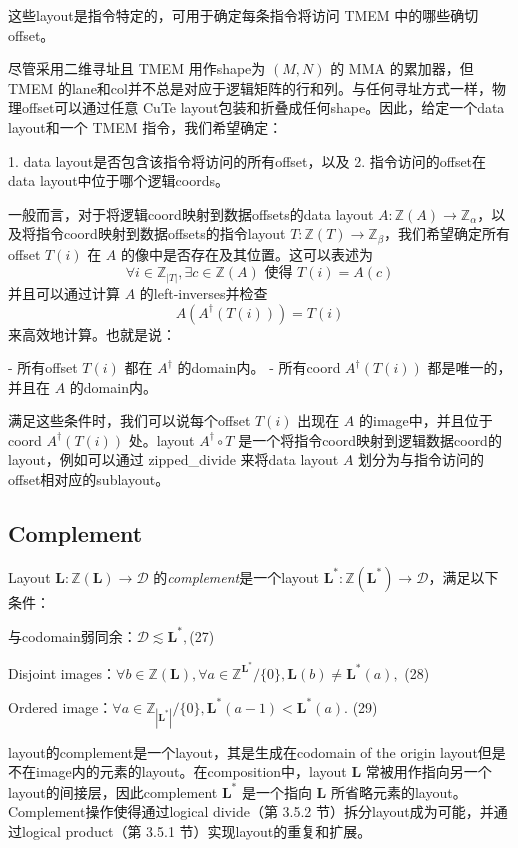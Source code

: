 \documentclass{article}
\begin{document}
这些layout是指令特定的，可用于确定每条指令将访问 TMEM 中的哪些确切offset。

尽管采用二维寻址且 TMEM 用作shape为 \((M, N)\) 的 MMA 的累加器，但 TMEM 的lane和col并不总是对应于逻辑矩阵的行和列。与任何寻址方式一样，物理offset可以通过任意 CuTe layout包装和折叠成任何shape。因此，给定一个data layout和一个 TMEM 指令，我们希望确定：

1. data layout是否包含该指令将访问的所有offset，以及
2. 指令访问的offset在data layout中位于哪个逻辑coords。

一般而言，对于将逻辑coord映射到数据offsets的data layout \( A : \mathbb{Z}(A) \to \mathbb{Z}_\alpha \)，以及将指令coord映射到数据offsets的指令layout \( T : \mathbb{Z}(T) \to \mathbb{Z}_\beta \)，我们希望确定所有offset \( T(i) \) 在 \( A \) 的像中是否存在及其位置。这可以表述为
\[
\forall i \in \mathbb{Z}_{|T|}, \exists c \in \mathbb{Z}(A) \text{ 使得 } T(i) = A(c)
\]
并且可以通过计算 \( A \) 的left-inverses并检查
\[
A(A^{\dagger}(T(i))) = T(i)
\]
来高效地计算。也就是说：

- 所有offset \( T(i) \) 都在 \( A^{\dagger} \) 的domain内。
- 所有coord \( A^{\dagger}(T(i)) \) 都是唯一的，并且在 \( A \) 的domain内。

满足这些条件时，我们可以说每个offset \( T(i) \) 出现在 \( A \) 的image中，并且位于coord \( A^{\dagger}(T(i)) \) 处。layout \( A^{\dagger} \circ T \) 是一个将指令coord映射到逻辑数据coord的layout，例如可以通过 zipped\_divide 来将data layout \( A \) 划分为与指令访问的offset相对应的sublayout。

\subsection{Complement}
Layout \( \mathbf{L} : \mathbb{Z}(\mathbf{L}) \to \mathcal{D} \) 的\textit{complement}是一个layout \( \mathbf{L}^* : \mathbb{Z}(\mathbf{L}^*) \to \mathcal{D} \)，满足以下条件：

与codomain弱同余：\( \mathcal{D} \lesssim \mathbf{L}^*,  \)\hfill(27)

Disjoint images：\( \forall b \in \mathbb{Z}(\mathbf{L}), \forall a \in \mathbb{Z}^{\mathbf{L}^*} / \{0\}, \mathbf{L}(b) \neq \mathbf{L}^*(a),  \) \hfill(28)

Ordered image：\( \forall a \in \mathbb{Z}_{|\mathbf{L}^*|}/\{0\}, \mathbf{L}^*(a-1) < \mathbf{L}^*(a).  \) \hfill(29)

layout的complement是一个layout，其是生成在codomain of the origin layout但是不在image内的元素的layout。在composition中，layout \( \mathbf{L} \) 常被用作指向另一个layout的间接层，因此complement \( \mathbf{L}^* \) 是一个指向 \( \mathbf{L} \) 所省略元素的layout。Complement操作使得通过logical divide（第 3.5.2 节）拆分layout成为可能，并通过logical product（第 3.5.1 节）实现layout的重复和扩展。
\end{document}
